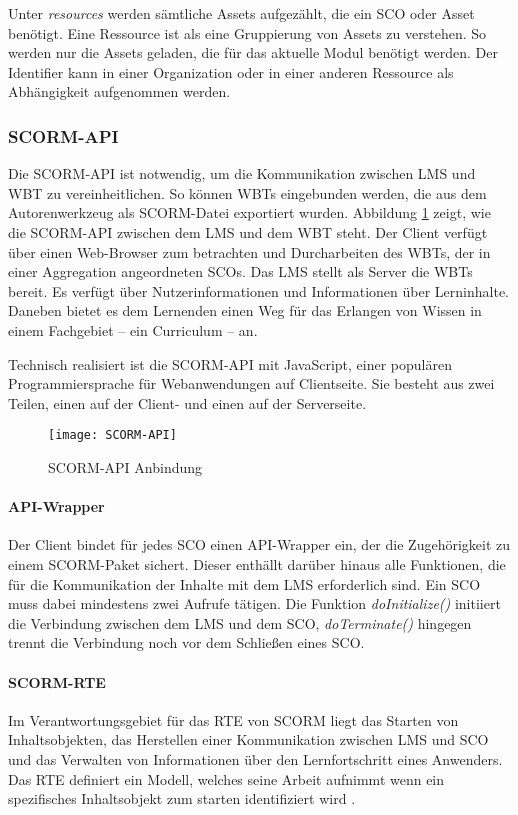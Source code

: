 Unter \textit{resources} werden sämtliche Assets aufgezählt, die ein SCO oder
Asset benötigt. Eine Ressource ist als eine Gruppierung von Assets zu
verstehen. So werden nur die Assets geladen, die für das aktuelle Modul
benötigt werden. Der Identifier kann in einer Organization oder in einer anderen
Ressource als Abhängigkeit aufgenommen werden.

\subsubsection{SCORM-API}
Die SCORM-API ist notwendig, um die Kommunikation zwischen LMS und WBT zu
vereinheitlichen. So können WBTs eingebunden werden, die aus dem Autorenwerkzeug
als SCORM-Datei exportiert wurden. Abbildung \ref{pic:scormApi} zeigt, wie die
SCORM-API zwischen dem LMS und dem WBT steht. Der Client verfügt über einen
Web-Browser zum betrachten und Durcharbeiten des WBTs, der in einer Aggregation
angeordneten SCOs. Das LMS stellt als Server die WBTs bereit. Es verfügt über
Nutzerinformationen und Informationen über Lerninhalte. Daneben bietet es dem
Lernenden einen Weg für das Erlangen von Wissen in einem Fachgebiet -- ein
Curriculum -- an.

Technisch realisiert ist die SCORM-API mit JavaScript, einer populären
Programmiersprache für Webanwendungen auf Clientseite. Sie besteht aus
zwei Teilen, einen auf der Client- und einen auf der Serverseite.

\begin{figure}[H]
\centering
\texttt{[image: SCORM-API]}
\caption{SCORM-API Anbindung\footnotemark}\label{pic:scormApi}
\end{figure}

\paragraph{API-Wrapper}
Der Client bindet für jedes SCO einen API-Wrapper ein, der die Zugehörigkeit zu
einem SCORM-Paket sichert. Dieser enthällt darüber hinaus alle Funktionen, die
für die Kommunikation der Inhalte mit dem LMS erforderlich sind.
Ein SCO muss dabei mindestens zwei Aufrufe tätigen. Die Funktion
\textit{doInitialize()} initiiert die Verbindung zwischen dem LMS und dem SCO,
\textit{doTerminate()} hingegen trennt die Verbindung noch vor dem Schließen
eines SCO.

\paragraph{SCORM-RTE}
Im Verantwortungsgebiet für das \ac{RTE} von SCORM liegt das Starten von
Inhaltsobjekten, das Herstellen einer Kommunikation zwischen LMS und SCO und das
Verwalten von Informationen über den Lernfortschritt eines Anwenders. Das RTE
definiert ein Modell, welches seine Arbeit aufnimmt wenn ein spezifisches
Inhaltsobjekt zum starten identifiziert wird \cite{adl:2009}.

